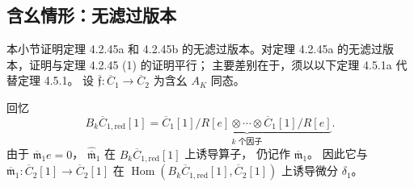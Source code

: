 
\subsection{含幺情形：无滤过版本}
\label{subsec:4-5-3}

本小节证明定理 4.2.45a 和 4.2.45b 的无滤过版本。对定理
4.2.45a 的无滤过版本，证明与定理 4.2.45 (1) 的证明平行；
主要差别在于，须以以下定理 4.5.1a 代替定理 4.5.1。
设 $\overline{\mathfrak f}\colon\overline C_1\to\overline C_2$
为含幺 $A_K$ 同态。

回忆
\[
 B_k\overline C_{1,\mathrm{red}}[1]
 =
 \underbrace{\overline C_1[1]/R[e]\otimes\cdots\otimes
 \overline C_1[1]/R[e]}_{k\text{ 个因子}}.
\]
由于 $\overline{\mathfrak m}_1e=0$，
$\widehat{\overline{\mathfrak m}}_1$ 在
$B_k\overline C_{1,\mathrm{red}}[1]$ 上诱导算子，
仍记作 $\widehat{\overline{\mathfrak m}}_1$。
因此它与
$\overline{\mathfrak m}_1\colon\overline C_2[1]\to
\overline C_2[1]$
在
$\operatorname{Hom}(B_k\overline C_{1,\mathrm{red}}[1],
\overline C_2[1])$
上诱导微分 $\delta_1$。


